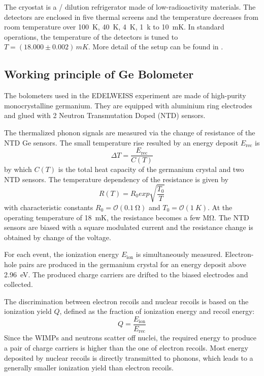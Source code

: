   The cryostat is a / dilution refrigerator made of low-radioactivity materials. The detectors are enclosed in five thermal screens and the temperature decreases from room temperature over \SI{100}{K}, \SI{40}{K}, \SI{4}{K}, \SI{1}{k} to \SI{10}{mK}. In standard operations, the temperature of the detectors is tuned to $T=(18.000 \pm 0.002)\,\si{mK}$. More detail of the setup can be found in \cite{Arm17}.

\subsection{Working principle of Ge Bolometer}
  \label{edw-ge}
  The bolometers used in the EDELWEISS experiment are made of high-purity monocrystalline germanium. They are equipped with aluminium ring electrodes and glued with 2 Neutron Transmutation Doped (NTD) sensors.

  The thermalized phonon signals are measured via the change of resistance of the NTD Ge sensors. The small temperature rise resulted by an energy deposit $E_{\mathrm{rec}}$ is
  \begin{equation}
      \Delta T = \frac{E_{\mathrm{rec}}}{C(T)}
  \end{equation}
  by which $C(T)$ is the total heat capacity of the germanium crystal and two NTD sensors. The temperature dependency of the resistance is given by
  \begin{equation}
    R(T)=R_{0}exp\sqrt{\frac{T_{0}}{T}}
  \end{equation}
  with characteristic constants $R_{0}=\mathcal{O}(\SI{0.1}{\ohm})$ and $T_{0}=\mathcal{O}(\SI{1}{K})$. At the operating temperature of \SI{18}{mK}, the resistance becomes a few \si{\mega\ohm}. The NTD sensors are biased with a square modulated current and the resistance change is obtained by change of the voltage.%

  For each event, the ionization energy $E_{\mathrm{ion}}$ is simultaneously measured. Electron-hole pairs are produced in the germanium crystal for an energy deposit above \SI{2.96}{eV}. The produced charge carriers are drifted to the biased electrodes and collected.

  The discrimination between electron recoils and nuclear recoils is based on the ionization yield $Q$, defined as the fraction of ionization energy and recoil energy:
  \begin{equation}
    Q=\frac{E_{\mathrm{ion}}}{E_{\mathrm{rec}}}
  \end{equation}
  Since the WIMPs and neutrons scatter off nuclei, the required energy to produce a pair of charge carriers is higher than the one of electron recoils. Most energy deposited by nuclear recoils is directly transmitted to phonons, which leads to a generally smaller ionization yield than electron recoils.

